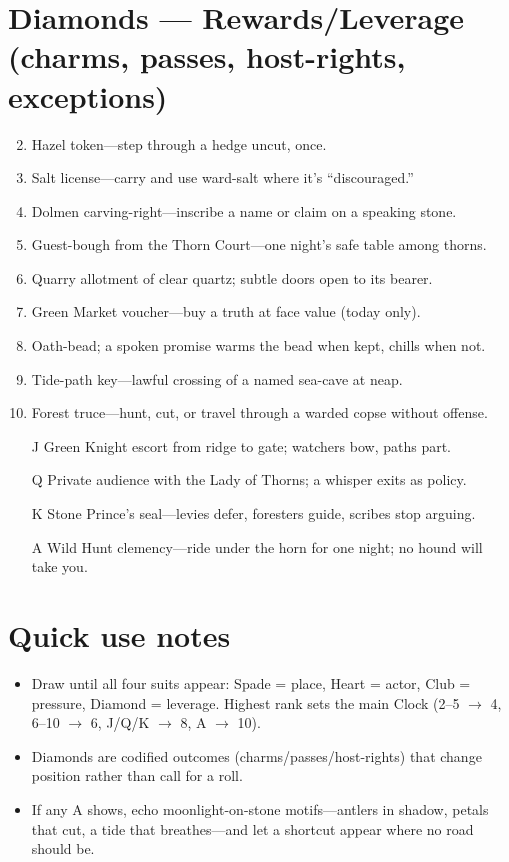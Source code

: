 \section*{Diamonds --- Rewards/Leverage (charms, passes, host-rights, exceptions)}
\label{sec:aelinnel-rewards}
\begin{enumerate}
\setcounter{enumi}{1}
\item Hazel token---step through a hedge uncut, once.
\item Salt license---carry and use ward-salt where it's ``discouraged.''
\item Dolmen carving-right---inscribe a name or claim on a speaking stone.
\item Guest-bough from the Thorn Court---one night's safe table among thorns.
\item Quarry allotment of clear quartz; subtle doors open to its bearer.
\item Green Market voucher---buy a truth at face value (today only).
\item Oath-bead; a spoken promise warms the bead when kept, chills when not.
\item Tide-path key---lawful crossing of a named sea-cave at neap.
\item Forest truce---hunt, cut, or travel through a warded copse without offense.
\item[J] Green Knight escort from ridge to gate; watchers bow, paths part.
\item[Q] Private audience with the Lady of Thorns; a whisper exits as policy.
\item[K] Stone Prince's seal---levies defer, foresters guide, scribes stop arguing.
\item[A] Wild Hunt clemency---ride under the horn for one night; no hound will take you.
\end{enumerate}

\section*{Quick use notes}
\label{sec:aelinnel-quick-use}
\begin{itemize}
\item Draw until all four suits appear: Spade = place, Heart = actor, Club = pressure, Diamond = leverage. Highest rank sets the main Clock (2--5 $\rightarrow$ 4, 6--10 $\rightarrow$ 6, J/Q/K $\rightarrow$ 8, A $\rightarrow$ 10).
\item Diamonds are codified outcomes (charms/passes/host-rights) that change position rather than call for a roll.
\item If any A shows, echo moonlight-on-stone motifs---antlers in shadow, petals that cut, a tide that breathes---and let a shortcut appear where no road should be.
\end{itemize}

